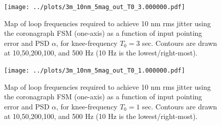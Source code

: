 \documentclass[10pt,preprint]{aastex631}
\begin{document}
\begin{figure}[h!]
\centering
\texttt{[image: ../plots/3m\_10nm\_5mag\_out\_T0\_3.000000.pdf]}
\caption{Map of loop frequencies required to achieve 10 nm rms jitter using the coronagraph FSM (one-axis) as a function of input pointing error and PSD $\alpha$, for knee-frequency $T_0 = 3$ sec.  Contours are drawn at 10,50,200,100, and 500 Hz (10 Hz is the lowest/right-most).  \label{fig:s2_T0-1}}
\end{figure}

\begin{figure}[h!]
\centering
\texttt{[image: ../plots/3m\_10nm\_5mag\_out\_T0\_1.000000.pdf]}
\caption{Map of loop frequencies required to achieve 10 nm rms jitter using the coronagraph FSM (one-axis) as a function of input pointing error and PSD $\alpha$, for knee-frequency $T_0 = 1$ sec.  Contours are drawn at 10,50,200,100, and 500 Hz (10 Hz is the lowest/right-most).  \label{fig:s2_T0-1}}
\end{figure}
\clearpage



\end{document}
